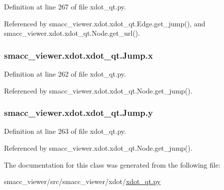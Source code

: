 Definition at line 267 of file xdot\+\_\+qt.\+py.



Referenced by smacc\+\_\+viewer.\+xdot.\+xdot\+\_\+qt.\+Edge.\+get\+\_\+jump(), and smacc\+\_\+viewer.\+xdot.\+xdot\+\_\+qt.\+Node.\+get\+\_\+url().

\subsubsection[{\texorpdfstring{x}{x}}]{\setlength{\rightskip}{0pt plus 5cm}smacc\+\_\+viewer.\+xdot.\+xdot\+\_\+qt.\+Jump.\+x}\hypertarget{classsmacc__viewer_1_1xdot_1_1xdot__qt_1_1Jump_a165dd6595f012b5dfaa5a9e72891313c}{}\label{classsmacc__viewer_1_1xdot_1_1xdot__qt_1_1Jump_a165dd6595f012b5dfaa5a9e72891313c}


Definition at line 262 of file xdot\+\_\+qt.\+py.



Referenced by smacc\+\_\+viewer.\+xdot.\+xdot\+\_\+qt.\+Node.\+get\+\_\+jump().

\subsubsection[{\texorpdfstring{y}{y}}]{\setlength{\rightskip}{0pt plus 5cm}smacc\+\_\+viewer.\+xdot.\+xdot\+\_\+qt.\+Jump.\+y}\hypertarget{classsmacc__viewer_1_1xdot_1_1xdot__qt_1_1Jump_a356d84d9e4adf445957ca3f65860af0e}{}\label{classsmacc__viewer_1_1xdot_1_1xdot__qt_1_1Jump_a356d84d9e4adf445957ca3f65860af0e}


Definition at line 263 of file xdot\+\_\+qt.\+py.



Referenced by smacc\+\_\+viewer.\+xdot.\+xdot\+\_\+qt.\+Node.\+get\+\_\+jump().



The documentation for this class was generated from the following file\+:\begin{DoxyCompactItemize}
\item 
smacc\+\_\+viewer/src/smacc\+\_\+viewer/xdot/\hyperlink{xdot__qt_8py}{xdot\+\_\+qt.\+py}\end{DoxyCompactItemize}
